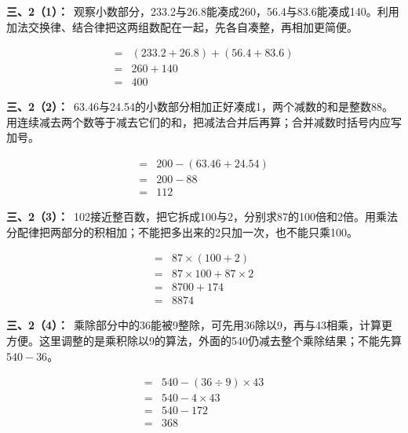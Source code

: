 \documentclass[multi=snippet,border=0pt]{standalone}
\newenvironment{snippet}[3]{\begin{minipage}{#1bp}\color{answerred}\fontsize{#2}{#3}\selectfont\raggedright}{\end{minipage}}
\begin{document}
\begin{snippet}{505}{11.5}{14}\textbf{三、2（1）：}\ 观察小数部分，233.2与26.8能凑成260，56.4与83.6能凑成140。利用加法交换律、结合律把这两组数配在一起，先各自凑整，再相加更简便。\end{snippet}
\begin{snippet}{198.233}{10.5}{12.8}\[\begin{aligned}={}&(233.2+26.8)+(56.4+83.6)\\={}&260+140\\={}&400\end{aligned}\]\end{snippet}
\begin{snippet}{505}{11.5}{14}\textbf{三、2（2）：}\ 63.46与24.54的小数部分相加正好凑成1，两个减数的和是整数88。用连续减去两个数等于减去它们的和，把减法合并后再算；合并减数时括号内应写加号。\end{snippet}
\begin{snippet}{164.567}{10.5}{12.8}\[\begin{aligned}={}&200-(63.46+24.54)\\={}&200-88\\={}&112\end{aligned}\]\end{snippet}
\begin{snippet}{505}{11.5}{14}\textbf{三、2（3）：}\ 102接近整百数，把它拆成100与2，分别求87的100倍和2倍。用乘法分配律把两部分的积相加；不能把多出来的2只加一次，也不能只乘100。\end{snippet}
\begin{snippet}{143.233}{10.5}{12.8}\[\begin{aligned}={}&87\times(100+2)\\={}&87\times100+87\times2\\={}&8700+174\\={}&8874\end{aligned}\]\end{snippet}
\begin{snippet}{505}{11.5}{14}\textbf{三、2（4）：}\ 乘除部分中的36能被9整除，可先用36除以9，再与43相乘，计算更方便。这里调整的是乘积除以9的算法，外面的540仍减去整个乘除结果；不能先算\(540-36\)。\end{snippet}
\begin{snippet}{152.733}{10.5}{12.8}\[\begin{aligned}={}&540-(36\div9)\times43\\={}&540-4\times43\\={}&540-172\\={}&368\end{aligned}\]\end{snippet}
\end{document}
